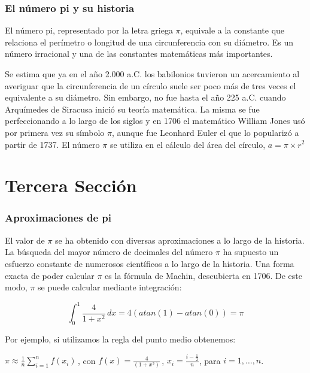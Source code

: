 \documentclass{beamer}
\begin{document}
\begin{frame}

\frametitle{El número pi y su historia}

El número pi, representado por la letra griega $\pi$, equivale a la constante que relaciona el perímetro o longitud de una 
circunferencia con su diámetro. Es un número irracional y una de las constantes matemáticas más importantes.

Se estima que ya en el año 2.000 a.C. los babilonios tuvieron un acercamiento al averiguar que la circunferencia de un 
círculo suele ser poco más de tres veces el equivalente a su diámetro. Sin embargo, no fue hasta el año 225 a.C. cuando 
Arquímedes de Siracusa inició su teoría matemática. La misma se fue perfeccionando a lo largo de los siglos y en 
1706 el matemático William Jones usó por primera vez su símbolo $\pi$, aunque fue Leonhard Euler el que lo popularizó
 a partir de 1737. El número $\pi$ se utiliza en el cálculo del área del círculo, $a = \pi \times r^2$

\end{frame}

\section{Tercera Sección}

\begin{frame}

\frametitle{Aproximaciones de pi}

El valor de $\pi$ se ha obtenido con diversas aproximaciones a lo largo de la historia. La búsqueda del mayor número de 
decimales del número $\pi$ ha supuesto un esfuerzo constante de numerosos científicos a lo largo de la historia.
Una forma exacta de poder calcular $\pi$ es la fórmula de Machin, descubierta en 1706. De este modo, 
$\pi$ se puede calcular mediante integración:

$$\int_{0}^{1} \!\frac{4}{1+x^2}\, dx = 4(atan(1) -atan(0)) = \pi $$

Por ejemplo, si utilizamos la regla del punto medio obtenemos:

\begin{center}
$ \pi \approx \frac{1}{n} \sum\limits_{i=1}^{n}f(x_i)\,$,
con $f(x) = \frac{4}{(1+x^2)}\,$,
$x_i = \frac{i - \frac{1}{2}}{n}$,
para $i = 1, \dots, n$.
\end{center}

\end{frame}
\end{document}
